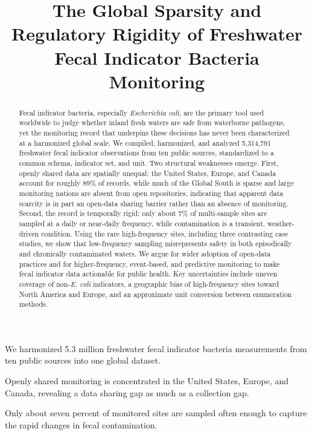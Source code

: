 \documentclass{agujournal2019}
\begin{document}
\title{The Global Sparsity and Regulatory Rigidity of Freshwater Fecal Indicator Bacteria Monitoring}





\begin{keypoints}
\item We harmonized 5.3 million freshwater fecal indicator bacteria measurements from ten public sources into one global dataset.
\item Openly shared monitoring is concentrated in the United States, Europe, and Canada, revealing a data sharing gap as much as a collection gap.
\item Only about seven percent of monitored sites are sampled often enough to capture the rapid changes in fecal contamination.
\end{keypoints}

\begin{abstract}
Fecal indicator bacteria, especially \textit{Escherichia coli}, are the primary tool used worldwide to judge whether inland fresh waters are safe from waterborne pathogens, yet the monitoring record that underpins these decisions has never been characterized at a harmonized global scale. We compiled, harmonized, and analyzed 5{,}314{,}791 freshwater fecal indicator observations from ten public sources, standardized to a common schema, indicator set, and unit. Two structural weaknesses emerge. First, openly shared data are spatially unequal: the United States, Europe, and Canada account for roughly 89\% of records, while much of the Global South is sparse and large monitoring nations are absent from open repositories, indicating that apparent data scarcity is in part an open-data sharing barrier rather than an absence of monitoring. Second, the record is temporally rigid: only about 7\% of multi-sample sites are sampled at a daily or near-daily frequency, while contamination is a transient, weather-driven condition. Using the rare high-frequency sites, including three contrasting case studies, we show that low-frequency sampling misrepresents safety in both episodically and chronically contaminated waters. We argue for wider adoption of open-data practices and for higher-frequency, event-based, and predictive monitoring to make fecal indicator data actionable for public health. Key uncertainties include uneven coverage of non-\textit{E. coli} indicators, a geographic bias of high-frequency sites toward North America and Europe, and an approximate unit conversion between enumeration methods.
\end{abstract}
\end{document}
